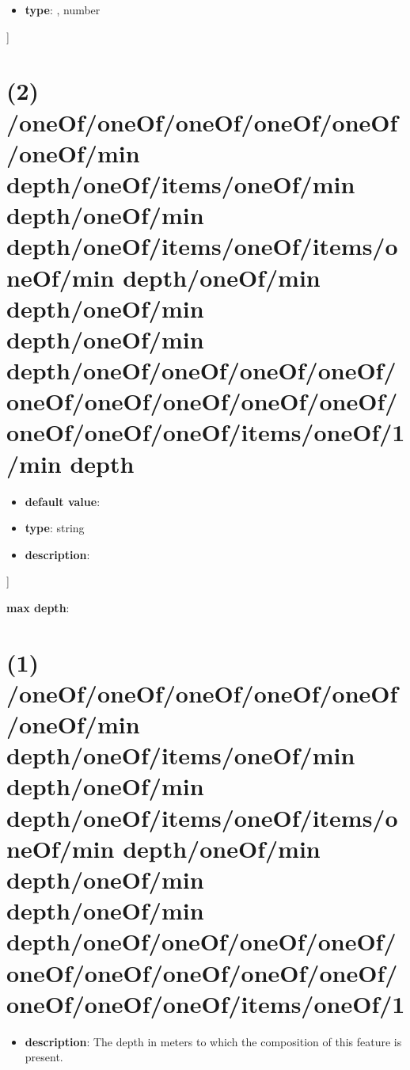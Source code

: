 \begin{itemize}[leftmargin=7em]\item {\bf type}: , number\end{itemize}]\section{(2) /oneOf/oneOf/oneOf/oneOf/oneOf/oneOf/min depth/oneOf/items/oneOf/min depth/oneOf/min depth/oneOf/items/oneOf/items/oneOf/min depth/oneOf/min depth/oneOf/min depth/oneOf/min depth/oneOf/oneOf/oneOf/oneOf/oneOf/oneOf/oneOf/oneOf/oneOf/oneOf/oneOf/oneOf/items/oneOf/1/min depth}
\begin{itemize}[leftmargin=2em]\item {\bf default value}: 
\item {\bf type}: string
\item {\bf description}: 
\end{itemize}]\item {\bf max depth}: \section{(1) /oneOf/oneOf/oneOf/oneOf/oneOf/oneOf/min depth/oneOf/items/oneOf/min depth/oneOf/min depth/oneOf/items/oneOf/items/oneOf/min depth/oneOf/min depth/oneOf/min depth/oneOf/min depth/oneOf/oneOf/oneOf/oneOf/oneOf/oneOf/oneOf/oneOf/oneOf/oneOf/oneOf/oneOf/items/oneOf/1}
\begin{itemize}[leftmargin=1em]\item {\bf description}: The depth in meters to which the composition of this feature is present.
\end{itemize}
